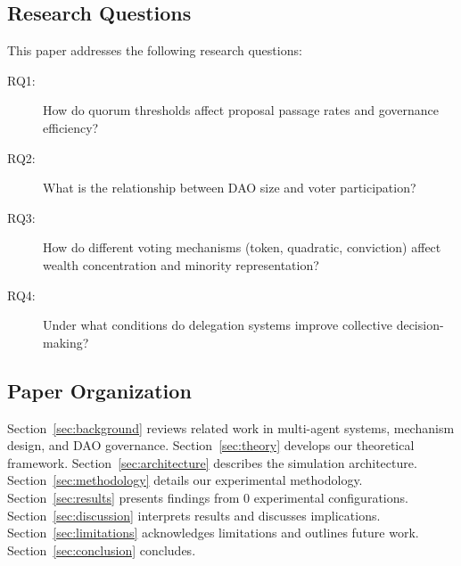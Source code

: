 \subsection{Research Questions}

This paper addresses the following research questions:

\begin{description}
    \item[RQ1:] How do quorum thresholds affect proposal passage rates and governance efficiency?
    \item[RQ2:] What is the relationship between DAO size and voter participation?
    \item[RQ3:] How do different voting mechanisms (token, quadratic, conviction) affect wealth concentration and minority representation?
    \item[RQ4:] Under what conditions do delegation systems improve collective decision-making?
\end{description}

\subsection{Paper Organization}

Section~\ref{sec:background} reviews related work in multi-agent systems, mechanism design, and DAO governance. Section~\ref{sec:theory} develops our theoretical framework. Section~\ref{sec:architecture} describes the simulation architecture. Section~\ref{sec:methodology} details our experimental methodology. Section~\ref{sec:results} presents findings from 0 experimental configurations. Section~\ref{sec:discussion} interprets results and discusses implications. Section~\ref{sec:limitations} acknowledges limitations and outlines future work. Section~\ref{sec:conclusion} concludes.
